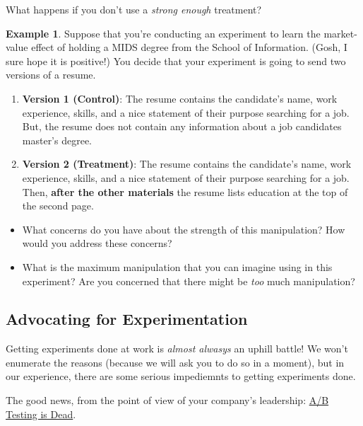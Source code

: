 \documentclass[
]{article}
\providecommand{\tightlist}{%
  \setlength{\itemsep}{0pt}\setlength{\parskip}{0pt}}
\theoremstyle{definition}
\theoremstyle{definition}
\newtheorem{example}{Example}[section]
\theoremstyle{definition}
\theoremstyle{definition}
\theoremstyle{remark}
\begin{document}
What happens if you don't use a \emph{strong enough} treatment?

\begin{example}

Suppose that you're conducting an experiment to learn the market-value effect of holding a MIDS degree from the School of Information. (Gosh, I sure hope it is positive!) You decide that your experiment is going to send two versions of a resume.

\begin{enumerate}
\def\labelenumi{\arabic{enumi}.}
\tightlist
\item
  \textbf{Version 1 (Control)}: The resume contains the candidate's name, work experience, skills, and a nice statement of their purpose searching for a job. But, the resume does not contain any information about a job candidates master's degree.
\item
  \textbf{Version 2 (Treatment)}: The resume contains the candidate's name, work experience, skills, and a nice statement of their purpose searching for a job. Then, \textbf{after the other materials} the resume lists education at the top of the second page.
\end{enumerate}

\end{example}

\begin{itemize}
\tightlist
\item
  What concerns do you have about the strength of this manipulation? How would you address these concerns?
\item
  What is the maximum manipulation that you can imagine using in this experiment? Are you concerned that there might be \emph{too} much manipulation?
\end{itemize}

\subsection{Advocating for Experimentation}\label{advocating-for-experimentation}

Getting experiments done at work is \emph{almost alwasys} an uphill battle! We won't enumerate the reasons (because we will ask you to do so in a moment), but in our experience, there are some serious impediemnts to getting experiments done.

The good news, from the point of view of your company's leadership: \href{https://venturebeat.com/automation/offerfit-gets-25m-to-kill-a-b-testing-for-marketing-with-machine-learning-personalization/}{A/B Testing is Dead}.
\end{document}
